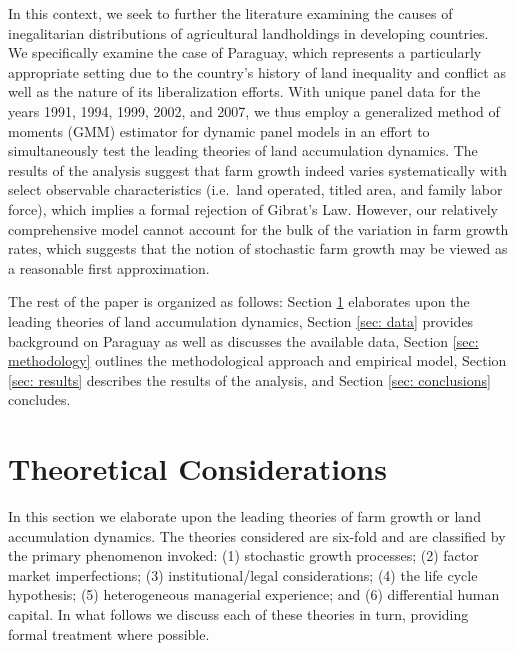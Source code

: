 \documentclass[english]{article}
\begin{document}
In this context, we seek to further the literature examining the causes of 
inegalitarian distributions of agricultural landholdings in developing 
countries.
We specifically examine the case of Paraguay, which represents a particularly 
appropriate setting due to the country's history of land inequality and conflict 
as well as the nature of its liberalization efforts.
With unique panel data for the years 1991, 1994, 1999, 2002, and 2007, we thus 
employ a generalized method of moments (GMM) estimator for dynamic panel 
models in an effort to simultaneously test the leading theories of land 
accumulation dynamics.
The results of the analysis suggest that farm growth indeed varies 
systematically with select observable characteristics 
(i.e.\ land operated, titled area, and family labor force), which implies a formal 
rejection of Gibrat's Law. 
However, our relatively comprehensive model cannot account for the bulk of 
the variation in farm growth rates, which suggests that the notion of 
stochastic farm growth may be viewed as a reasonable first approximation.

The rest of the paper is organized as follows: Section \ref{sec: theories} 
elaborates upon the leading theories of land accumulation dynamics, 
Section \ref{sec: data} provides background on Paraguay as well as discusses 
the available data, Section \ref{sec: methodology} outlines the methodological 
approach and empirical model, Section \ref{sec: results} describes the results 
of the analysis, and Section \ref{sec: conclusions} concludes.


\section{Theoretical Considerations}
\label{sec: theories}

In this section we elaborate upon the leading theories of farm growth or 
land accumulation dynamics.  
The theories considered are six-fold and are classified by the primary 
phenomenon invoked: (1) stochastic growth processes; 
(2) factor market imperfections; (3) institutional/legal considerations; 
(4) the life cycle hypothesis; (5) heterogeneous managerial experience; and 
(6) differential human capital. 
In what follows we discuss each of these theories in turn, providing formal
treatment where possible.
\end{document}
